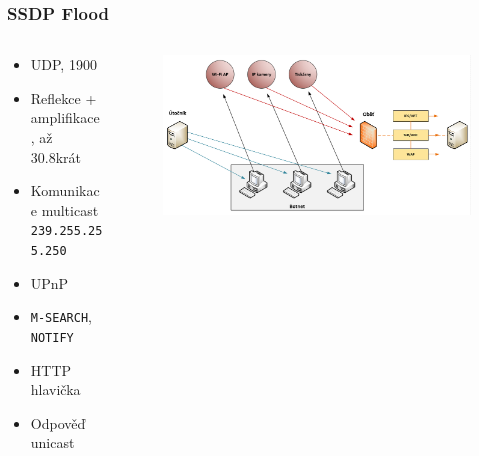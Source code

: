 \documentclass[%
  12pt,       				%
	t,                  %
	aspectratio=1610,   %
	unicode,						%
czech,              %
]{beamer}				    	%
\begin{document}
\begin{frame} 
\frametitle{SSDP Flood}

\begin{columns}[T] 								%
	\begin{column}{0.4\textwidth}		%
		\begin{itemize}
			\item UDP, 1900
			\item Reflekce + amplifikace, až 30.8krát
			\item Komunikace multicast \texttt{239.255.255.250}
			\item UPnP
			\item \texttt{M-SEARCH}, \texttt{NOTIFY}
			\item HTTP hlavička
			\item Odpověď unicast
		\end{itemize}
	\end{column}
	\begin{column}{0.6\textwidth}		%
		\begin{figure}%
			\centering
			\vspace{1cm}	              %
			\includegraphics[width=1\columnwidth]{obrazky/ssdp_flood_schema.png}
		\end{figure}
	\end{column}
\end{columns}											%
\end{frame}

\end{document}
